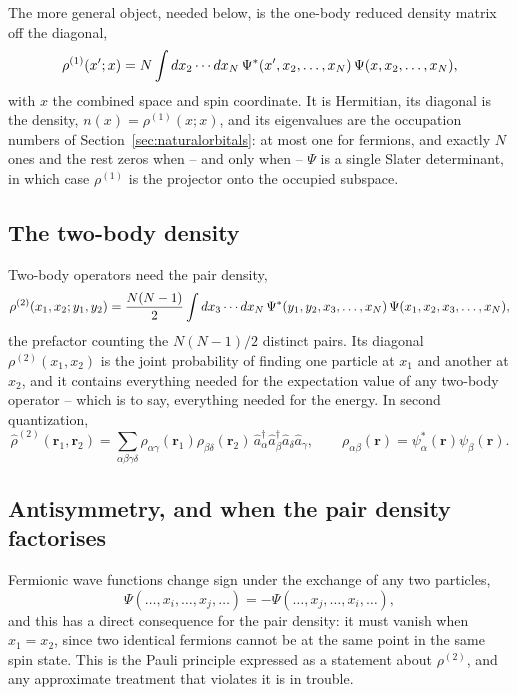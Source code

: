 The more general object, needed below, is the one-body reduced density matrix
off the diagonal,
\begin{equation}
  \rho^{(1)}(x';x) = N\int dx_2\cdots dx_N\,
    \Psi^{*}(x',x_2,\dots,x_N)\,\Psi(x,x_2,\dots,x_N),
  \label{eq:8-rho1}
\end{equation}
with $x$ the combined space and spin coordinate.  It is Hermitian, its
diagonal is the density, $n(x)=\rho^{(1)}(x;x)$, and its eigenvalues are the
occupation numbers of Section~\ref{sec:naturalorbitals}: at most one for
fermions, and exactly $N$ ones and the rest zeros when -- and only when --
$\Psi$ is a single Slater determinant, in which case $\rho^{(1)}$ is the
projector onto the occupied subspace.

\subsection{The two-body density}
\label{sec:twobodydensity}

Two-body operators need the pair density,
\begin{equation}
  \rho^{(2)}(x_1,x_2;y_1,y_2) = \frac{N(N-1)}{2}
    \int dx_3\cdots dx_N\,
    \Psi^{*}(y_1,y_2,x_3,\dots,x_N)\,\Psi(x_1,x_2,x_3,\dots,x_N),
  \label{eq:8-rho2}
\end{equation}
the prefactor counting the $N(N-1)/2$ distinct pairs.  Its diagonal
$\rho^{(2)}(x_1,x_2)$ is the joint probability of finding one particle at
$x_1$ and another at $x_2$, and it contains everything needed for the
expectation value of any two-body operator -- which is to say, everything
needed for the energy.  In second quantization,
\begin{equation}
  \hat{\rho}^{(2)}(\bm{r}_1,\bm{r}_2)
   = \sum_{\alpha\beta\gamma\delta}
     \rho_{\alpha\gamma}(\bm{r}_1)\rho_{\beta\delta}(\bm{r}_2)\,
     \hat{a}^{\dagger}_{\alpha}\hat{a}^{\dagger}_{\beta}
     \hat{a}_{\delta}\hat{a}_{\gamma},
  \qquad
  \rho_{\alpha\beta}(\bm{r})
   = \psi^{*}_{\alpha}(\bm{r})\psi_{\beta}(\bm{r}).
  \label{eq:8-rho2secondquant}
\end{equation}

\subsection{Antisymmetry, and when the pair density factorises}
\label{sec:factorisation}

Fermionic wave functions change sign under the exchange of any two particles,
\begin{equation}
  \Psi(\dots,x_i,\dots,x_j,\dots)
   = -\Psi(\dots,x_j,\dots,x_i,\dots),
  \label{eq:8-antisymmetry}
\end{equation}
and this has a direct consequence for the pair density: it must vanish when
$x_1=x_2$, since two identical fermions cannot be at the same point in the
same spin state.  This is the Pauli principle expressed as a statement about
$\rho^{(2)}$, and any approximate treatment that violates it is in trouble.


